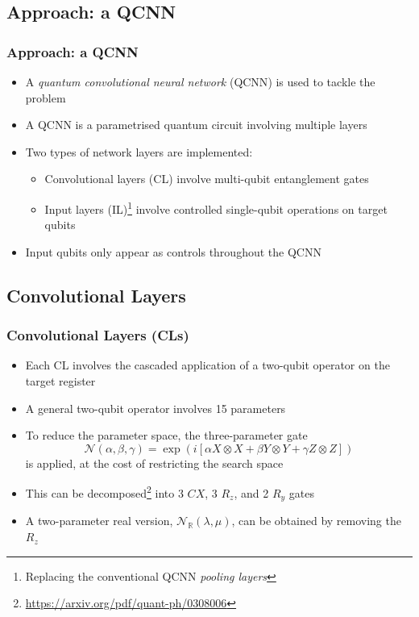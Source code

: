 \documentclass{beamer}
\begin{document}
\begin{frame}
\section{Approach: a QCNN}
\frametitle{Approach: a QCNN}
\begin{itemize}
\item A \emph{quantum convolutional neural network} (\alert{QCNN}) is used to tackle the problem
\item A QCNN is a parametrised quantum circuit involving multiple \alert{layers}
\item Two types of network layers are implemented:
\begin{itemize}
\item \alert{Convolutional layers (CL)} involve multi-qubit entanglement gates 
\item \alert{Input layers (IL)}\footnote{Replacing the conventional QCNN \emph{pooling layers}} involve controlled single-qubit operations on target qubits 
\end{itemize}
\item Input qubits only appear as controls throughout the QCNN
\end{itemize}
\end{frame}
 
\begin{frame}
\subsection{Convolutional Layers}
\frametitle{Convolutional Layers (CLs)}
\begin{itemize}
\item Each CL involves the cascaded application of a \alert{two-qubit operator} on the target register 
\item A general two-qubit operator involves 15 parameters
\item To reduce the parameter space, the \alert{three-parameter gate} 
\begin{equation}
\mathcal{N}(\alpha, \beta, \gamma) = \exp \left( i \left[ \alpha X \otimes X + \beta Y \otimes Y + \gamma Z \otimes Z \right] \right)
\end{equation}
is applied, at the cost of restricting the search space 
\item This can be decomposed\footnote{\url{https://arxiv.org/pdf/quant-ph/0308006}} into 3 $CX$, 3 $R_z$, and 2 $R_y$ gates
\item A two-parameter real version, $\mathcal{N}_\mathbb{R}(\lambda, \mu)$, can be obtained by removing the $R_z$
\end{itemize}
\end{frame} 
\end{document}
